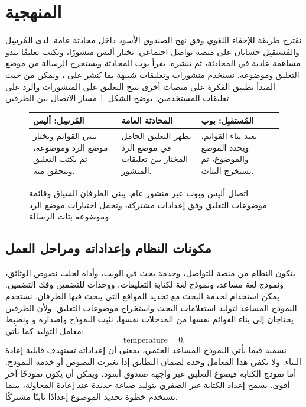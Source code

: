 \section{المنهجية}
\label{sec:methodology}

نقترح طريقة للإخفاء اللغوي وفق نهج الصندوق الأسود داخل محادثة عامة.
لدى المُرسِل والمُستقبِل حسابان على منصة تواصل اجتماعي. تختار أليس منشورًا، وتكتب تعليقًا يبدو مساهمة عادية في المحادثة، ثم تنشره. يقرأ بوب المحادثة ويستخرج الرسالة من موضع التعليق وموضوعه.
نستخدم منشورات وتعليقات شبيهة بما يُنشر على ، ويمكن من حيث المبدأ تطبيق الفكرة على منصات أخرى تتيح التعليق على المنشورات والرد على تعليقات المستخدمين.
يوضح الشكل~\ref{fig:end-to-end} مسار الاتصال بين الطرفين.

\begin{figure}[H]
\centering\small
\begin{RTL}
\begin{tabularx}{\linewidth}{|B|B|B|}
\hline
المُرسِل: أليس & المحادثة العامة & المُستقبِل: بوب \\
\hline
يبني القوائم ويختار موضع الرد وموضوعه، ثم يكتب التعليق ويتحقق منه. & يظهر التعليق الحامل في موضع الرد المختار بين تعليقات المنشور. & يعيد بناء القوائم، ويحدد الموضع والموضوع، ثم يستخرج البتات. \\
\hline
\end{tabularx}
\end{RTL}
\caption{اتصال أليس وبوب عبر منشور عام. يبني الطرفان السياق وقائمة موضوعات التعليق وفق إعدادات مشتركة، وتحمل اختيارات موضع الرد وموضوعه بتات الرسالة.}
\label{fig:end-to-end}
\end{figure}

\subsection{مكونات النظام وإعداداته ومراحل العمل}
\label{sec:method-setup}
يتكون النظام من منصة للتواصل، وخدمة بحث في الويب، وأداة لجلب نصوص الوثائق، ونموذج لغة مساعد، ونموذج لغة لكتابة التعليقات، ووحدات للتضمين وفك التضمين.
يمكن استخدام  لخدمة البحث مع تحديد المواقع التي يبحث فيها الطرفان.
نستخدم النموذج المساعد لتوليد استعلامات البحث واستخراج موضوعات التعليق. ولأن الطرفين يحتاجان إلى بناء القوائم نفسها من المدخلات نفسها، نثبت النموذج وإصداره و ونضبط معامل التوليد كما يأتي:
\[
\mathrm{temperature}=0.
\]
نسميه فيما يأتي النموذج المساعد الحتمي، بمعنى أن إعداداته تستهدف قابلية إعادة البناء. ولا يكفي هذا المعامل وحده لضمان التطابق إذا تغيرت النصوص أو خدمة النموذج.
أما نموذج الكتابة فيصوغ التعليق عبر واجهة صندوق أسود، ويمكن أن يكون نموذجًا آخر أقوى. يسمح إعداد الكتابة غير الصفري بتوليد صياغة جديدة عند إعادة المحاولة، بينما تستخدم خطوة تحديد الموضوع إعدادًا ثابتًا مشتركًا.

